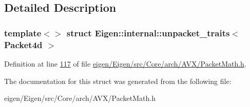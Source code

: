 \subsection{Detailed Description}
\subsubsection*{template$<$$>$\newline
struct Eigen\+::internal\+::unpacket\+\_\+traits$<$ Packet4d $>$}



Definition at line \hyperlink{eigen_2_eigen_2src_2_core_2arch_2_a_v_x_2_packet_math_8h_source_l00117}{117} of file \hyperlink{eigen_2_eigen_2src_2_core_2arch_2_a_v_x_2_packet_math_8h_source}{eigen/\+Eigen/src/\+Core/arch/\+A\+V\+X/\+Packet\+Math.\+h}.



The documentation for this struct was generated from the following file\+:\begin{DoxyCompactItemize}
\item 
eigen/\+Eigen/src/\+Core/arch/\+A\+V\+X/\+Packet\+Math.\+h\end{DoxyCompactItemize}
